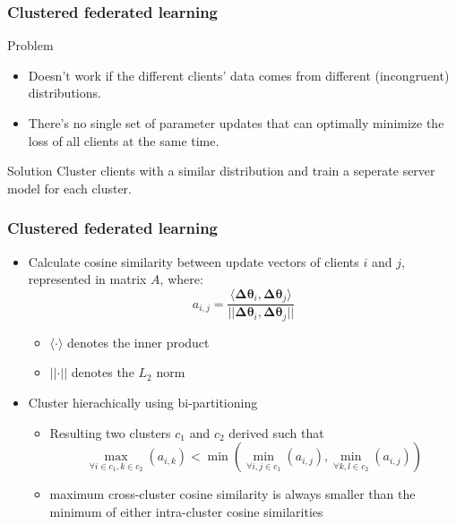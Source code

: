 \documentclass[aspectratio=169]{beamer}
\begin{document}
\begin{frame}
    \frametitle{Clustered federated learning}
    \begin{block}{Problem}
        \begin{itemize}
            \item Doesn't work if the different clients' data comes from different (incongruent) distributions.
            \item There's no single set of parameter updates that can optimally minimize the loss of all clients at the same time. 
        \end{itemize}
    \end{block}
    \vspace{.5cm}
    \pause
    \begin{alertblock}{Solution}
        Cluster clients with a similar distribution and train a seperate server model for each cluster.
    \end{alertblock}
\end{frame}

\begin{frame}
    \frametitle{Clustered federated learning}
\begin{itemize}
    \item Calculate cosine similarity between update vectors of clients $i$ and $j$, represented in matrix $A$, where:
    \begin{equation}
        a_{i,j} = \frac{ \langle \pmb \Delta \pmb \theta _i, \pmb \Delta \pmb \theta _j \rangle}{ \vert\vert \pmb \Delta  \pmb \theta _i, \pmb \Delta \pmb  \theta _j \vert\vert}
    \end{equation}
    \begin{itemize}
        \item  $\langle \cdot \rangle$ denotes the inner product
        \item $\lvert \lvert \cdot \rvert \rvert$ denotes the $L_2$ norm
    \end{itemize}   
    \item Cluster hierachically using bi-partitioning
    \begin{itemize}
        \item Resulting two clusters $c_1$ and $c_2$ derived such that
        \begin{equation}
            \max_{\forall i \in c_1, k\in c_2}(a_{i,k}) < 
            \min(\min_{\forall i,j \in c_1}(a_{i,j}), \min_{\forall k,l \in c_2}(a_{i,j}))
        \end{equation}  
        \item maximum cross-cluster
cosine similarity is always smaller than the minimum of either intra-cluster cosine similarities
    \end{itemize}
\end{itemize}
\end{frame}
\end{document}
